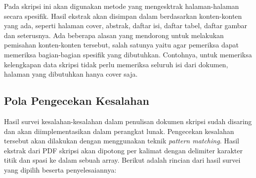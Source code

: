 Pada skripsi ini akan digunakan metode yang mengesktrak halaman-halaman secara spesifik. Hasil ekstrak akan disimpan dalam berdasarkan konten-konten yang ada, seperti halaman cover, abstrak, daftar isi, daftar tabel, daftar gambar dan seterusnya. Ada beberapa alasan yang mendorong untuk melakukan pemisahan konten-konten tersebut, salah satunya yaitu agar pemeriksa dapat memeriksa bagian-bagian spesifik yang dibutuhkan. Contohnya, untuk memeriksa kelengkapan data skripsi tidak perlu memeriksa seluruh isi dari dokumen, halaman yang dibutuhkan hanya cover saja. 

\subsection{Pola Pengecekan Kesalahan}
Hasil survei kesalahan-kesalahan dalam penulisan dokumen skripsi sudah disaring dan akan diimplementasikan dalam perangkat lunak. Pengecekan kesalahan tersebut akan dilakukan dengan menggunakan teknik \textit{pattern matching}. Hasil ekstrak dari PDF skripsi akan dipotong per kalimat dengan delimiter karakter titik dan spasi ke dalam sebuah array. Berikut adalah rincian dari hasil survei yang dipilih beserta penyelesaiannya:

